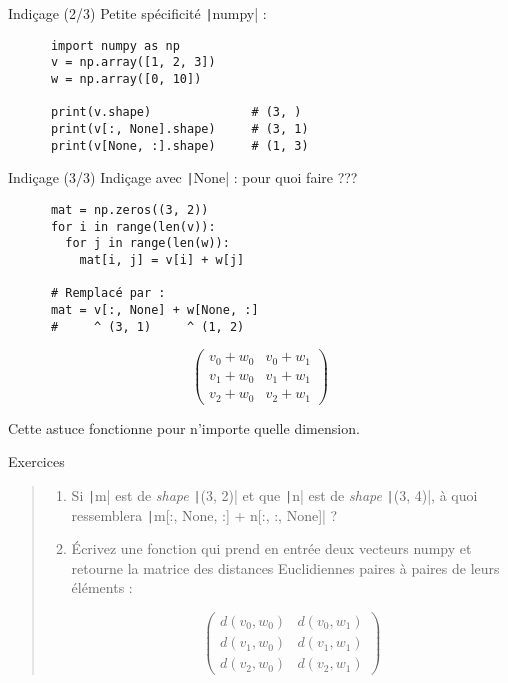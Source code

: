 \documentclass[10pt]{beamer}
\begin{document}
\begin{frame}[fragile]{Indiçage (2/3)}
  Petite spécificité \texttt|numpy| :

  \begin{beamercodeblock}
    \begin{verbatim}
      import numpy as np
      v = np.array([1, 2, 3])
      w = np.array([0, 10])

      print(v.shape)              # (3, )
      print(v[:, None].shape)     # (3, 1)
      print(v[None, :].shape)     # (1, 3)
    \end{verbatim}
  \end{beamercodeblock}
\end{frame}

\begin{frame}[fragile]{Indiçage (3/3)}
  Indiçage avec \texttt|None| : pour quoi faire ???

  \begin{beamercodeblock}
    \begin{verbatim}
      mat = np.zeros((3, 2))
      for i in range(len(v)):
        for j in range(len(w)):
          mat[i, j] = v[i] + w[j]
      
      # Remplacé par :
      mat = v[:, None] + w[None, :]
      #     ^ (3, 1)     ^ (1, 2)
    \end{verbatim}
  \end{beamercodeblock}

  $$
    \left(
      \begin{matrix}
        v_0 + w_0 & v_0 + w_1 \\
        v_1 + w_0 & v_1 + w_1 \\
        v_2 + w_0 & v_2 + w_1
      \end{matrix}
    \right)
  $$

  Cette astuce fonctionne pour n'importe quelle dimension.
\end{frame}

\begin{frame}[fragile]{Exercices}
  \begin{quote}
    \begin{enumerate}
      \item Si \texttt|m| est de \emph{shape} \texttt|(3, 2)| et que \texttt|n| est de \emph{shape} \texttt|(3, 4)|, 
    à quoi ressemblera \texttt|m[:, None, :] + n[:, :, None]| ?
    
      \item Écrivez une fonction qui prend en entrée deux vecteurs numpy et retourne la matrice des distances Euclidiennes paires à paires de leurs éléments :
    
    $$
    \left(
      \begin{matrix}
        d(v_0, w_0) & d(v_0, w_1) \\
        d(v_1, w_0) & d(v_1, w_1) \\
        d(v_2, w_0) & d(v_2, w_1)
      \end{matrix}
    \right)
  $$
    \end{enumerate}
  \end{quote}
\end{frame}
\end{document}
